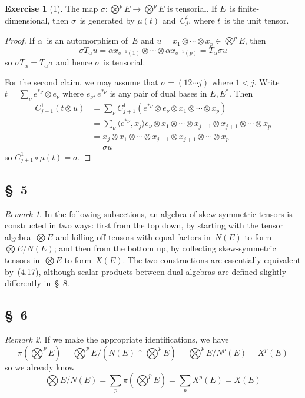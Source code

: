 \documentclass[letterpaper,12pt]{article}
\newcommand{\sect}{\cap}
\newcommand{\after}{\circ}
\newcommand{\tprod}{\otimes}
\newcommand{\bigtprod}{\bigotimes}
\newcommand{\medtprod}{{\textstyle\bigtprod}}
\newcommand{\sprod}[2]{\langle#1,#2\rangle}
\newcommand{\multi}[4]{#2_{#3}#1\cdots#1#2_{#4}}
\newcommand{\tprods}[3]{\multi{\tprod}{#1}{#2}{#3}}
\theoremstyle{definition}
\newtheorem*{exer}{Exercise}
\theoremstyle{remark}
\newtheorem*{rmk}{Remark}
\begin{document}
\begin{exer}[1]
The map \(\sigma:\medtprod^p E\to\medtprod^p E\) is tensorial. If \(E\)~is finite-dimensional, then \(\sigma\)~is generated by \(\mu(t)\) and~\(C^i_j\), where \(t\)~is the unit tensor.
\end{exer}
\begin{proof}
If \(\alpha\)~is an automorphism of~\(E\) and \(u=\tprods{x}{1}{p}\in\medtprod^p E\), then
\[\sigma T_{\alpha}u=\tprods{\alpha x}{\sigma^{-1}(1)}{\sigma^{-1}(p)}=T_{\alpha}\sigma u\]
so \(\sigma T_{\alpha}=T_{\alpha}\sigma\) and hence \(\sigma\)~is tensorial.

For the second claim, we may assume that \(\sigma=(12\cdots j)\) where \(1<j\). Write \(t=\sum_{\nu}e^{*\nu}\tprod e_{\nu}\) where \(e_{\nu},e^{*\nu}\) is any pair of dual bases in \(E,E^*\). Then
\begin{align*}
C^1_{j+1}(t\tprod u)&=\sum_{\nu}C^1_{j+1}(e^{*\nu}\tprod e_{\nu}\tprod\tprods{x}{1}{p})\\
	&=\sum_{\nu}\sprod{e^{*\nu}}{x_j}e_{\nu}\tprod\tprods{x}{1}{j-1}\tprod\tprods{x}{j+1}{p}\\
	&=x_j\tprod\tprods{x}{1}{j-1}\tprod\tprods{x}{j+1}{p}\\
	&=\sigma u
\end{align*}
so \(C^1_{j+1}\after\mu(t)=\sigma\).
\end{proof}

\subsection*{\S~5}
\begin{rmk}
In the following subsections, an algebra of skew-symmetric tensors is constructed in two ways: first from the top down, by starting with the tensor algebra~\(\medtprod E\) and killing off tensors with equal factors in~\(N(E)\) to form \(\medtprod E/N(E)\); and then from the bottom up, by collecting skew-symmetric tensors in~\(\medtprod E\) to form~\(X(E)\). The two constructions are essentially equivalent by~(4.17), although scalar products between dual algebras are defined slightly differently in~\S~8.
\end{rmk}

\subsection*{\S~6}
\begin{rmk}
If we make the appropriate identifications, we have
\[\pi(\medtprod^p E)=\medtprod^p E/(N(E)\sect\medtprod^p E)=\medtprod^p E/N^p(E)=X^p(E)\]
so we already know
\[\medtprod E/N(E)=\sum_p \pi(\medtprod^p E)=\sum_p X^p(E)=X(E)\]
\end{rmk}
\end{document}
